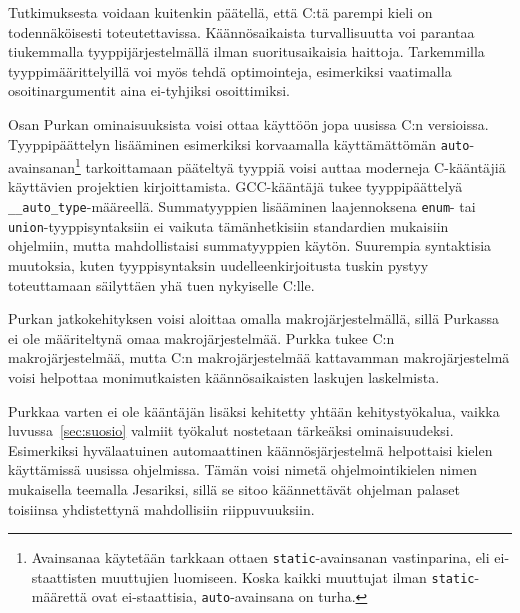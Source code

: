 Tutkimuksesta voidaan kuitenkin päätellä, että C:tä parempi kieli on
todennäköisesti toteutettavissa. Käännösaikaista turvallisuutta voi parantaa
tiukemmalla tyyppijärjestelmällä ilman suoritusaikaisia haittoja. Tarkemmilla
tyyppimäärittelyillä voi myös tehdä optimointeja, esimerkiksi vaatimalla
osoitinargumentit aina ei-tyhjiksi osoittimiksi.

Osan Purkan ominaisuuksista voisi ottaa käyttöön jopa uusissa C:n versioissa.
Tyyppipäättelyn lisääminen esimerkiksi korvaamalla käyttämättömän
\texttt{auto}-avainsanan\footnote{Avainsanaa käytetään tarkkaan ottaen
\texttt{static}-avainsanan vastinparina, eli ei-staattisten muuttujien
luomiseen. Koska kaikki muuttujat ilman \texttt{static}-määrettä ovat
ei-staattisia, \texttt{auto}-avainsana on turha.} tarkoittamaan pääteltyä
tyyppiä voisi auttaa moderneja C-kääntäjiä käyttävien projektien
kirjoittamista. GCC-kääntäjä tukee tyyppipäättelyä
\texttt{\_\_auto\_type}-määreellä. Summatyyppien lisääminen laajennoksena
\texttt{enum}- tai \texttt{union}-tyyppisyntaksiin ei vaikuta tämänhetkisiin
standardien mukaisiin ohjelmiin, mutta mahdollistaisi summatyyppien käytön.
Suurempia syntaktisia muutoksia, kuten tyyppisyntaksin uudelleenkirjoitusta
tuskin pystyy toteuttamaan säilyttäen yhä tuen nykyiselle C:lle.

Purkan jatkokehityksen voisi aloittaa omalla makrojärjestelmällä, sillä
Purkassa ei ole määriteltynä omaa makrojärjestelmää. Purkka tukee C:n
makrojärjestelmää, mutta C:n makrojärjestelmää kattavamman makrojärjestelmä
voisi helpottaa monimutkaisten käännösaikaisten laskujen laskelmista.

Purkkaa varten ei ole kääntäjän lisäksi kehitetty yhtään kehitystyökalua,
vaikka luvussa~\ref{sec:suosio} valmiit työkalut nostetaan tärkeäksi
ominaisuudeksi. Esimerkiksi hyvälaatuinen automaattinen käännösjärjestelmä
helpottaisi kielen käyttämissä uusissa ohjelmissa. Tämän voisi nimetä
ohjelmointikielen nimen mukaisella teemalla Jesariksi, sillä se sitoo
käännettävät ohjelman palaset toisiinsa yhdistettynä mahdollisiin
riippuvuuksiin.
